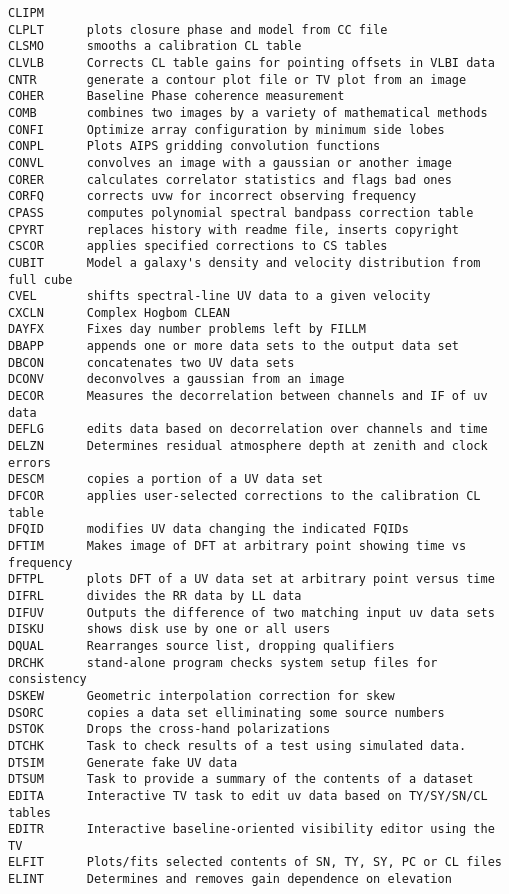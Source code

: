 \begin{verbatim}
CLIPM
CLPLT      plots closure phase and model from CC file
CLSMO      smooths a calibration CL table
CLVLB      Corrects CL table gains for pointing offsets in VLBI data
CNTR       generate a contour plot file or TV plot from an image
COHER      Baseline Phase coherence measurement
COMB       combines two images by a variety of mathematical methods
CONFI      Optimize array configuration by minimum side lobes
CONPL      Plots AIPS gridding convolution functions
CONVL      convolves an image with a gaussian or another image
CORER      calculates correlator statistics and flags bad ones
CORFQ      corrects uvw for incorrect observing frequency
CPASS      computes polynomial spectral bandpass correction table
CPYRT      replaces history with readme file, inserts copyright
CSCOR      applies specified corrections to CS tables
CUBIT      Model a galaxy's density and velocity distribution from full cube
CVEL       shifts spectral-line UV data to a given velocity
CXCLN      Complex Hogbom CLEAN
DAYFX      Fixes day number problems left by FILLM
DBAPP      appends one or more data sets to the output data set
DBCON      concatenates two UV data sets
DCONV      deconvolves a gaussian from an image
DECOR      Measures the decorrelation between channels and IF of uv data
DEFLG      edits data based on decorrelation over channels and time
DELZN      Determines residual atmosphere depth at zenith and clock errors
DESCM      copies a portion of a UV data set
DFCOR      applies user-selected corrections to the calibration CL table
DFQID      modifies UV data changing the indicated FQIDs
DFTIM      Makes image of DFT at arbitrary point showing time vs frequency
DFTPL      plots DFT of a UV data set at arbitrary point versus time
DIFRL      divides the RR data by LL data
DIFUV      Outputs the difference of two matching input uv data sets
DISKU      shows disk use by one or all users
DQUAL      Rearranges source list, dropping qualifiers
DRCHK      stand-alone program checks system setup files for consistency
DSKEW      Geometric interpolation correction for skew
DSORC      copies a data set elliminating some source numbers
DSTOK      Drops the cross-hand polarizations
DTCHK      Task to check results of a test using simulated data.
DTSIM      Generate fake UV data
DTSUM      Task to provide a summary of the contents of a dataset
EDITA      Interactive TV task to edit uv data based on TY/SY/SN/CL tables
EDITR      Interactive baseline-oriented visibility editor using the TV
ELFIT      Plots/fits selected contents of SN, TY, SY, PC or CL files
ELINT      Determines and removes gain dependence on elevation

\end{verbatim}
